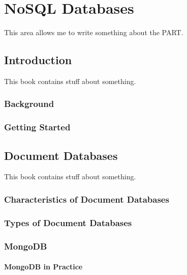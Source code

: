 

\part{NoSQL Databases}
\label{part:nosqldatabases}
This  area allows me to write something about the PART.

\chapter{Introduction}
\label{chap:nosql:introduction}
This book contains stuff about something.

\section{Background}
\section{Getting Started}

\chapter{Document Databases}
\label{chap:nosql:documentdatabases}
This book contains stuff about something.

\section{Characteristics of Document Databases}
\section{Types of Document Databases}
\section{MongoDB}
\subsection{MongoDB in Practice}


